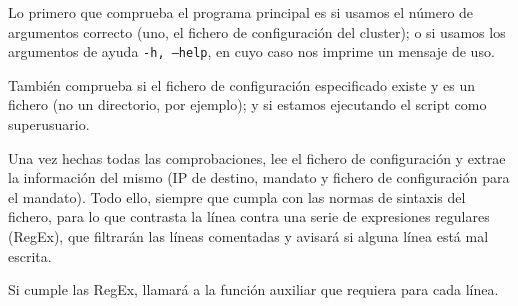 Lo primero que comprueba el programa principal es si usamos el número de argumentos correcto (uno, el fichero de configuración del cluster); o si usamos los argumentos de ayuda \texttt{-h, --help}, en cuyo caso nos imprime un mensaje de uso.

También comprueba si el fichero de configuración especificado existe y es un fichero (no un directorio, por ejemplo); y si estamos ejecutando el script como superusuario.

Una vez hechas todas las comprobaciones, lee el fichero de configuración y extrae la información del mismo (IP de destino, mandato y fichero de configuración para el mandato). Todo ello, siempre que cumpla con las normas de sintaxis del fichero, para lo que contrasta la línea contra una serie de expresiones regulares (RegEx), que filtrarán las líneas comentadas y avisará si alguna línea está mal escrita.

Si cumple las RegEx, llamará a la función auxiliar que requiera para cada línea.